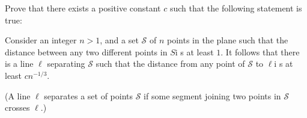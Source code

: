 Prove that there exists a positive constant $c$ such that the following statement is true:

Consider an integer $n>1$, and a set $\mathcal{S}$ of $n$ points in the plane such that the distance between any two different points in $S$i s at least $1$. It follows that there is a line $\ell$ separating $\mathcal{S}$ such that the distance from any point of $\mathcal{S}$ to $\ell$i s at least $cn^{-1/3}$.

(A line $\ell$ separates a set of points $\mathcal{S}$ if some segment joining two points in $\mathcal{S}$ crosses $\ell$.)
